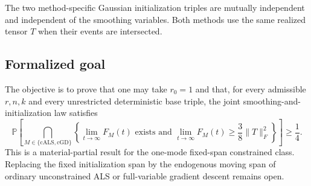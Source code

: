 \begin{assumption}\label{assump:joint_initialization}
The two method-specific Gaussian initialization triples are mutually
independent and independent of the smoothing variables.  Both methods use the
same realized tensor $T$ when their events are intersected.
\end{assumption}

\subsection{Formalized goal}

The objective is to prove that one may take $r_0=1$ and that, for every
admissible $r,n,k$ and every unrestricted deterministic base triple, the joint
smoothing-and-initialization law satisfies
\[
 \mathbb P\!\left[
 \bigcap_{M\in\{\mathrm{cALS},\mathrm{cGD}\}}
 \left\{
 \lim_{t\to\infty}F_M(t)\text{ exists and }
 \lim_{t\to\infty}F_M(t)\ge\frac38\|T\|_F^2
 \right\}
 \right]\ge\frac14.
\]
This is a material-partial result for the one-mode fixed-span constrained
class.  Replacing the fixed initialization span by the endogenous moving span
of ordinary unconstrained ALS or full-variable gradient descent remains open.
